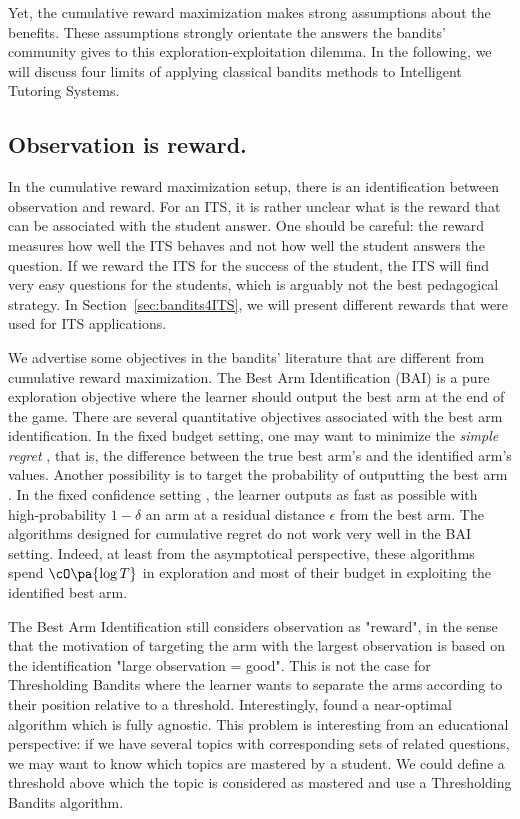 Yet, the cumulative reward maximization makes strong assumptions about the benefits. These assumptions strongly orientate the answers the bandits' community gives to this exploration-exploitation dilemma.
In the following, we will discuss four limits of applying classical bandits methods to Intelligent Tutoring Systems.

\subsection{Observation is reward.}
\label{ss:shortcoming-reward}
In the cumulative reward maximization setup, there is an identification between observation and reward. For an ITS, it is rather unclear what is the reward that can be associated with the student answer. One should be careful: the reward measures how well the ITS behaves and not how well the student answers the question. If we reward the ITS for the success of the student, the ITS will find very easy questions for the students, which is arguably not the best pedagogical strategy. In Section~\ref{sec:bandits4ITS}, we will present different rewards that were used for ITS applications. 

We advertise some objectives in the bandits' literature that are different from cumulative reward maximization. The Best Arm Identification (BAI) \citep{audibert2010bai, gabillon2012bai} is a pure exploration objective where the learner should output the best arm at the end of the game. There are several quantitative objectives associated with the best arm identification. In the fixed budget setting, one may want to minimize the \emph{simple regret} \citep{audibert2010bai}, that is, the difference between the true best arm's and the identified arm's values. Another possibility is to target the probability of outputting the best arm \citep{carpentier2016tight}. In the fixed confidence setting \citep{garivier2016optimalbai, kaufmann2016complexity}, the learner outputs as fast as possible with high-probability $1- \delta$ an arm at a residual distance $\epsilon$ from the best arm. The algorithms designed for cumulative regret do not work very well in the BAI setting. Indeed, at least from the asymptotical perspective, these algorithms spend $\cO\pa{\log{T}}$ in exploration and most of their budget in exploiting the identified best arm. 

The Best Arm Identification still considers observation as "reward", in the sense that the motivation of targeting the arm with the largest observation is based on the identification "large observation = good". This is not the case for Thresholding Bandits \citep{locatelli2016thresholding, garivier2016thresholding, mukherjee2017thresholding} where the learner wants to separate the arms according to their position relative to a threshold. Interestingly, \citet{locatelli2016thresholding} found a near-optimal algorithm which is fully agnostic. This problem is interesting from an educational perspective: if we have several topics with corresponding sets of related questions, we may want to know which topics are mastered by a student. We could define a threshold above which the topic is considered as mastered and use a Thresholding Bandits algorithm.

